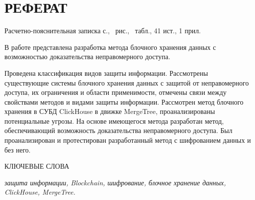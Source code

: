 \section*{РЕФЕРАТ}

Расчетно-пояснительная записка \pageref{LastPage} с., \totalfigures\ рис., \totaltables\ табл., 41 ист., 1 прил.

В работе представлена разработка метода блочного хранения данных с возможностью доказательства неправомерного доступа.

Проведена классификация видов защиты информации. Рассмотрены существующие системы блочного хранения данных с защитой от неправомерного доступа, их ограничения и области применимости, отмечены связи между свойствами методов и видами защиты информации. Рассмотрен метод блочного хранения в СУБД ClickHouse в движке MergeTree, проанализированы потенциальные угрозы. На основе имеющегося метода разработан метод, обеспечивающий возможность доказательства неправомерного доступа. Был проанализирован и протестирован разработанный метод с шифрованием данных и без него.

КЛЮЧЕВЫЕ СЛОВА

\textit{защита информации, Blockchain, шифрование, блочное хранение данных, ClickHouse, MergeTree.}

\pagebreak